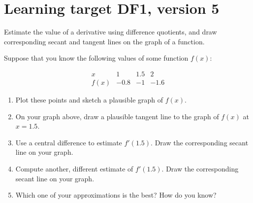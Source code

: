 
\usepackage{pgfplots}



\section{Learning target DF1, version 5}

Estimate the value of a derivative using difference quotients, and draw corresponding secant and tangent lines on the graph of a function.

\hrulefill


\everymath{\displaystyle}

Suppose that you know the following values of some function $f(x)$:

\[
\begin{array}{c||r|r|r}
      x  &  1 &  1.5   &  2 \\\hline
    f(x) & -0.8 & -1   & -1.6
\end{array}
\]
\begin{enumerate}[leftmargin=0pt]

\item Plot these points and sketch a plausible graph of $f(x)$.


\item On your graph above, draw a plausible tangent line to the graph of $f(x)$ at $x=1.5$.

\item Use a central difference to estimate $f'(1.5)$. Draw the corresponding secant line on your graph.
\vfill

\item Compute another, different estimate of $f'(1.5)$. Draw the corresponding secant line on your graph.

\vfill

\item Which one of your approximations is the best? How do you know?

\vspace{1cm}

\end{enumerate}


